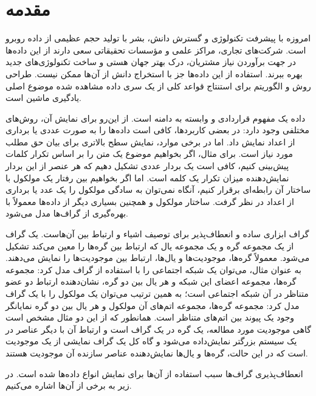 \clearpage
{}
\chapter*{مقدمه}

امروزه با پیشرفت تکنولوژی و گسترش دانش، بشر با تولید حجم عظیمی از داده روبرو است. شرکت‌های تجاری، مراکز علمی و مؤسسات تحقیقاتی سعی دارند از این داده‌ها در جهت برآوردن نیاز مشتریان، درک بهتر جهان هستی و ساخت تکنولوژی‌های جدید بهره ببرند. استفاده از این داده‌ها جز با استخراج دانش از آن‌ها ممکن نیست. طراحی روش و الگوریتم  برای استنتاج قواعد کلی از یک سری داده مشاهده شده موضوع اصلی یادگیری ماشین است.

داده یک مفهوم قراردادی و وابسته به دامنه است. از این‌رو برای نمایش آن، روش‌های مختلفی وجود دارد: در بعضی کاربردها، کافی است داده‌ها را به صورت عددی یا برداری از اعداد نمایش داد. اما در برخی موارد، نمایش سطح بالاتری برای بیان حق مطلب مورد نیاز است. برای مثال، اگر بخواهیم موضوع یک متن را بر اساس تکرار کلمات پیش‌بینی کنیم، کافی است یک بردار عددی تشکیل دهیم که هر عنصر از این بردار نمایش‌دهنده میزان تکرار یک کلمه است. اما اگر بخواهیم بین رفتار یک مولکول با ساختار آن رابطه‌ای برقرار کنیم، آنگاه نمی‌توان به سادگی مولکول را یک عدد یا برداری از اعداد در نظر گرفت. ساختار مولکول و همچنین بسیاری دیگر از داده‌ها معمولاً با بهره‌گیری از گراف‌ها مدل می‌شود.

گراف ابزاری ساده و انعطاف‌پذیر برای توصیف اشیاء و ارتباط بین آن‌هاست. یک گراف از یک مجموعه گره‌ و یک مجموعه یال‌ که ارتباط بین گره‌ها را معین می‌کند تشکیل می‌شود. معمولاً  گره‌ها، موجودیت‌ها و یال‌ها، ارتباط بین موجودیت‌ها را نمایش می‌دهند. به عنوان مثال، می‌توان یک شبکه اجتماعی را با استفاده از گراف مدل کرد: مجموعه گره‌ها، مجموعه اعضای این شبکه و هر یال بین دو گره، نشان‌دهنده ارتباط دو عضو متناظر در آن شبکه اجتماعی است؛ به همین ترتیب می‌توان یک مولکول را با یک گراف مدل کرد: مجموعه گره‌ها، مجموعه اتم‌های آن مولکول و هر یال بین دو گره نمایانگر وجود یک پیوند بین اتم‌های متناظر است. همانطور که از این دو مثال مشخص است گاهی موجودیت مورد مطالعه، یک گره در یک گراف است و ارتباط آن با دیگر عناصر در یک سیستم بزرگتر نمایش‌داده می‌شود و گاه کل یک گراف نمایشی از یک موجودیت است که در این حالت، گره‌ها و یال‌ها نمایش‌دهنده عناصر سازنده آن موجودیت هستند.

انعطاف‌پذیری گراف‌ها سبب استفاده از آن‌ها برای نمایش انواع داده‌ها شده است. در زیر به برخی از آن‌ها اشاره می‌کنیم.


